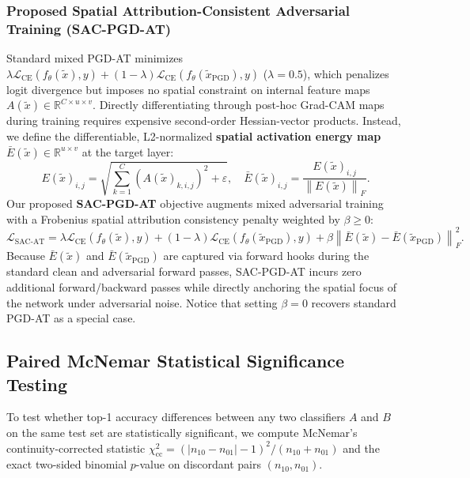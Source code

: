 \documentclass[final,5p,times,twocolumn]{elsarticle}
\begin{document}
\subsubsection{Proposed Spatial Attribution-Consistent Adversarial Training (SAC-PGD-AT)}
Standard mixed PGD-AT \cite{madry2018towards,zhang2019theoretically} minimizes $\lambda \mathcal{L}_{\text{CE}}(f_\theta(\tilde{x}), y) + (1-\lambda)\mathcal{L}_{\text{CE}}(f_\theta(\tilde{x}_{\text{PGD}}), y)$ ($\lambda=0.5$), which penalizes logit divergence but imposes no spatial constraint on internal feature maps $A(\tilde{x}) \in \mathbb{R}^{C \times u \times v}$. Directly differentiating through post-hoc Grad-CAM maps during training requires expensive second-order Hessian-vector products. Instead, we define the differentiable, L2-normalized \textbf{spatial activation energy map} $\bar{E}(\tilde{x}) \in \mathbb{R}^{u \times v}$ at the target layer:
\begin{equation}
    E(\tilde{x})_{i,j} = \sqrt{\sum_{k=1}^{C} \left(A(\tilde{x})_{k,i,j}\right)^2 + \varepsilon}, \quad
    \bar{E}(\tilde{x})_{i,j} = \frac{E(\tilde{x})_{i,j}}{\left\| E(\tilde{x}) \right\|_F}.
    \label{eq:spatial_energy}
\end{equation}
Our proposed \textbf{SAC-PGD-AT} objective augments mixed adversarial training with a Frobenius spatial attribution consistency penalty weighted by $\beta \ge 0$:
\begin{equation}
    \mathcal{L}_{\text{SAC-AT}} = \lambda \mathcal{L}_{\text{CE}}(f_\theta(\tilde{x}), y) + (1 - \lambda) \mathcal{L}_{\text{CE}}(f_\theta(\tilde{x}_{\text{PGD}}), y) + \beta \left\| \bar{E}(\tilde{x}) - \bar{E}(\tilde{x}_{\text{PGD}}) \right\|_F^2.
    \label{eq:sac_at}
\end{equation}
Because $\bar{E}(\tilde{x})$ and $\bar{E}(\tilde{x}_{\text{PGD}})$ are captured via forward hooks during the standard clean and adversarial forward passes, SAC-PGD-AT incurs zero additional forward/backward passes while directly anchoring the spatial focus of the network under adversarial noise. Notice that setting $\beta = 0$ recovers standard PGD-AT as a special case.

\subsection{Paired McNemar Statistical Significance Testing}
To test whether top-1 accuracy differences between any two classifiers $A$ and $B$ on the same test set are statistically significant, we compute McNemar's continuity-corrected statistic \cite{mcnemar1947note} $\chi_{\text{cc}}^2 = (|n_{10} - n_{01}| - 1)^2 / (n_{10} + n_{01})$ and the exact two-sided binomial $p$-value on discordant pairs $(n_{10}, n_{01})$.
\end{document}
